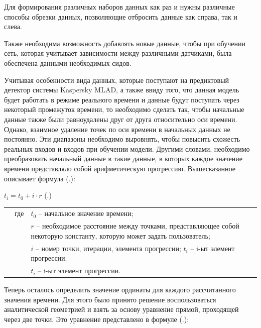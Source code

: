 {  \par \redline Для формирования различных наборов данных как раз и нужны различные способы обрезки данных, позволяющие отбросить данные как справа, так и слева. 
 
  \par \redline Также необходима возможность добавлять новые данные, чтобы при обучении сеть, которая учитывает зависимости между различными датчиками, была обеспечена данными необходимых сидов.  

  \par \redline Учитывая особенности вида данных, которые поступают на предиктовый детектор системы Kaspersky MLAD, а также ввиду того, что данная модель будет работать в режиме реального времени и данные будут поступать через некоторый промежуток времени, то необходимо сделать так, чтобы начальные данные также были равноудалены друг от друга относительно оси времени. Однако, взаимное удаление точек по оси времени в начальных данных не постоянно. Эти диапазоны необходимо выровнять, чтобы повысить схожесть реальных входов и входов при обучении модели. Другими словами, необходимо преобразовать начальный данные в такие данные, в которых каждое значение времени представляло собой арифметическую прогрессию. Вышесказанное описывает формула (\thechaptercntr .\theformulacntr):

	\formulaspace \par \redline 
    $t_i = t_0 + i \cdot r$
	  \hfill (\thechaptercntr .\theformulacntr) \redline
	\formulaspace \addtocounter{formulacntr}{1}

  \begin{tabular}{p{}p{}p{}}
		& где  & $t_0$ {--} начальное значение времени; \\
		& 	   & $r$ {--} необходимое расстояние между точками, представляющее собой некоторую константу, которую может задать пользователь; \\
    & 	   & $i$ {--} номер точки, итерации, элемента прогрессии; $t_i$ {--} i-ыт элемент прогрессии.  \\
    & 	   & $t_i$ {--} i-ыт элемент прогрессии. \\
  \end{tabular}

  \par \redline Теперь осталось определить значение ординаты для каждого рассчитанного значения времени. Для этого было принято решение воспользоваться аналитической геометрией и взять за основу уравнение прямой, проходящей через две точки. Это уравнение представлено в формуле (\thechaptercntr .\theformulacntr):  

}
